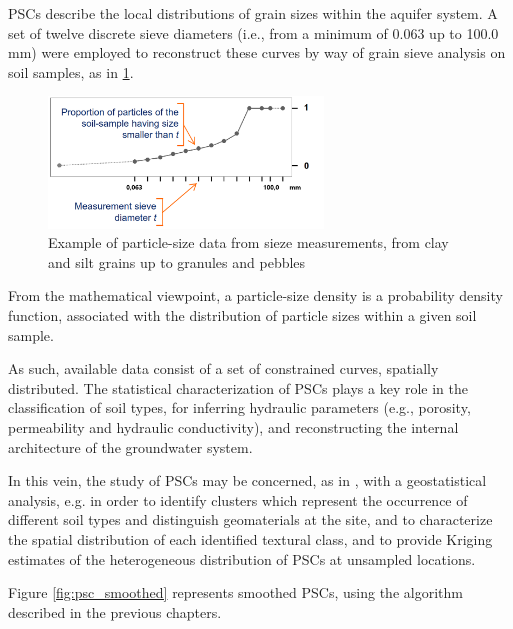 PSCs describe the local distributions of grain sizes within the aquifer system.
A set of twelve discrete sieve diameters (i.e., from a minimum of 0.063 up to 100.0 mm) were employed to reconstruct these curves by way of grain sieve analysis on soil samples, as in \ref{fig:sieve}.

\begin{figure}
	\includegraphics[height=3.5cm]{./pictures/psc/psc.png}
	\centering
	\caption{Example of particle-size data from sieze measurements, from clay and silt grains up to granules and pebbles}
	\label{fig:sieve}	
\end{figure}

From the mathematical viewpoint, a particle-size density is a probability density function, associated with the distribution of particle sizes within a given soil sample. 

As such, available data consist of a set of constrained curves, spatially distributed. The statistical characterization of PSCs plays a key role in the classification of soil types, for inferring hydraulic parameters (e.g., porosity, permeability and hydraulic conductivity), and reconstructing the internal architecture of the groundwater system. 

In this vein, the study of PSCs may be concerned, as in \citep{menafoglio:psc}, with a geostatistical analysis, e.g. in order to identify clusters which represent the occurrence of different soil types and distinguish geomaterials at the site, and to characterize the spatial distribution of each identified textural class, and to provide Kriging estimates of the heterogeneous distribution of PSCs at unsampled locations.

Figure \ref{fig:psc_smoothed} represents smoothed PSCs, using the algorithm described in the previous chapters.

